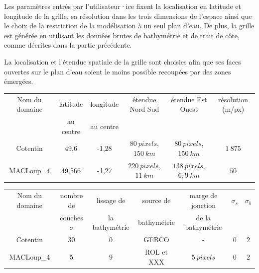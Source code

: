 \documentclass[10pt,a4paper,titlepage]{article}
\begin{document}
    
    Les paramètres entrés par l'utilisateur·ice fixent la localisation en latitude et longitude de la grille, sa résolution dans les trois dimensions de l'espace ainsi que le choix de la restriction de la modélisation à un seul plan d'eau.
    De plus, la grille est générée en utilisant les données brutes de bathymétrie et de trait de côte, comme décrites dans la partie précédente.
    
    La localisation et l'étendue spatiale de la grille sont choisies afin que ses faces ouvertes sur le plan d'eau soient le moins possible recoupées par des zones émergées.
    
    \begin{table}[h!]
        \centering
        
        \begin{tabular}{||c||c|c|c|c|c|}
            \hline
            Nom du domaine & latitude & longitude & étendue Nord Sud & étendue Est Ouest & résolution (m/px)\\
            & au centre & au centre &  &  & \\
            \hline
            Cotentin & 49,6 & -1,28 & $80~pixels$, $150~km$ & $80~pixels$, $150~km$ & $1~875$\\
            MACLoup\_4 & 49,566 & -1,27 & $220~pixels$, $11~km$ & $138~pixels$, $6,9~km$ & $50$\\
            \hline
        \end{tabular}\newline
        
        \begin{tabular}{||c||c|c|c|c|c|c|}
            \hline
            Nom du domaine & nombre de & lissage de & source de & marge de jonction & $\sigma_{s}$ & $\sigma_{b}$ \\
            & couches $\sigma$ & la bathymétrie & bathymétrie & de la bathymétrie &  & \\
            \hline
            Cotentin & 30 & 0 & GEBCO & - & 0  & 2 \\
            MACLoup\_4 & 5 & 9 & ROL et XXX & $5~pixels$ & 0 & 2 \\
            \hline
        \end{tabular}\newline
        

\end{table}
\end{document}
